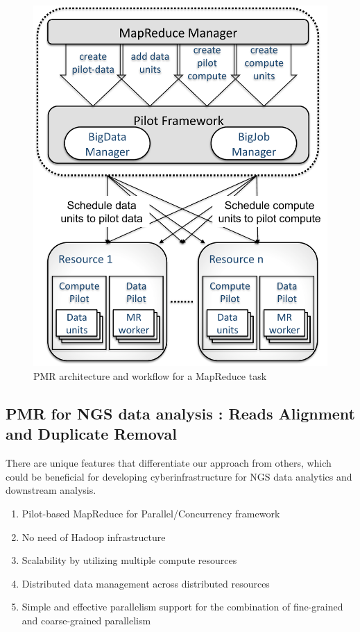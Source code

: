 \documentclass{sig-alternate}
\begin{document}
\begin{figure}
 \centering
\includegraphics[scale=0.45]{figures/F1.pdf} 
\caption{\small PMR architecture and workflow for a MapReduce task}
  \label{fig:arch-pj-saga-mr} 
\end{figure}


\subsection{PMR for NGS data analysis : Reads Alignment and Duplicate Removal}

There are unique features that differentiate our approach from others, which could be beneficial for developing cyberinfrastructure for NGS data analytics and downstream analysis.  
\begin{enumerate}

\item Pilot-based MapReduce for Parallel/Concurrency framework 
\item No need of Hadoop infrastructure
\item Scalability by utilizing multiple compute resources
\item Distributed data management across distributed resources
\item Simple and effective parallelism support for the combination of fine-grained and coarse-grained parallelism
\end{enumerate}
 
\end{document}
